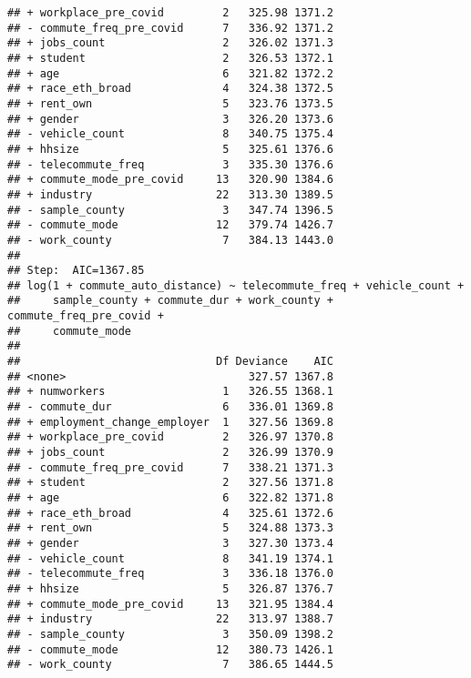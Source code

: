 \documentclass[
]{article}
\newenvironment{Shaded}{\begin{snugshade}}{\end{snugshade}}
\newcommand{\CommentTok}[1]{\textcolor[rgb]{0.56,0.35,0.01}{\textit{#1}}}
\newcommand{\NormalTok}[1]{#1}
\newcommand{\SpecialCharTok}[1]{\textcolor[rgb]{0.00,0.00,0.00}{#1}}
\begin{document}
\begin{verbatim}
## + workplace_pre_covid         2   325.98 1371.2
## - commute_freq_pre_covid      7   336.92 1371.2
## + jobs_count                  2   326.02 1371.3
## + student                     2   326.53 1372.1
## + age                         6   321.82 1372.2
## + race_eth_broad              4   324.38 1372.5
## + rent_own                    5   323.76 1373.5
## + gender                      3   326.20 1373.6
## - vehicle_count               8   340.75 1375.4
## + hhsize                      5   325.61 1376.6
## - telecommute_freq            3   335.30 1376.6
## + commute_mode_pre_covid     13   320.90 1384.6
## + industry                   22   313.30 1389.5
## - sample_county               3   347.74 1396.5
## - commute_mode               12   379.74 1426.7
## - work_county                 7   384.13 1443.0
## 
## Step:  AIC=1367.85
## log(1 + commute_auto_distance) ~ telecommute_freq + vehicle_count + 
##     sample_county + commute_dur + work_county + commute_freq_pre_covid + 
##     commute_mode
## 
##                              Df Deviance    AIC
## <none>                            327.57 1367.8
## + numworkers                  1   326.55 1368.1
## - commute_dur                 6   336.01 1369.8
## + employment_change_employer  1   327.56 1369.8
## + workplace_pre_covid         2   326.97 1370.8
## + jobs_count                  2   326.99 1370.9
## - commute_freq_pre_covid      7   338.21 1371.3
## + student                     2   327.56 1371.8
## + age                         6   322.82 1371.8
## + race_eth_broad              4   325.61 1372.6
## + rent_own                    5   324.88 1373.3
## + gender                      3   327.30 1373.4
## - vehicle_count               8   341.19 1374.1
## - telecommute_freq            3   336.18 1376.0
## + hhsize                      5   326.87 1376.7
## + commute_mode_pre_covid     13   321.95 1384.4
## + industry                   22   313.97 1388.7
## - sample_county               3   350.09 1398.2
## - commute_mode               12   380.73 1426.1
## - work_county                 7   386.65 1444.5
\end{verbatim}

\begin{Shaded}
\end{Shaded}
\end{document}
